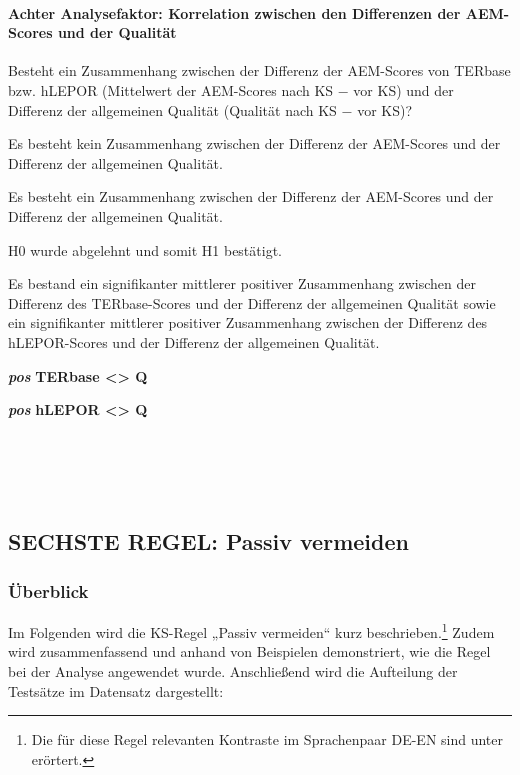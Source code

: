 \paragraph*{Achter Analysefaktor: Korrelation zwischen den Differenzen der AEM-Scores und der Qualität}
\begin{description}[font=\normalfont\bfseries]
\item [Fragestellung:] Besteht ein Zusammenhang zwischen der Differenz der AEM-Scores von TERbase bzw. hLEPOR (Mittelwert der AEM-Scores nach KS $-$ vor KS) und der Differenz der allgemeinen Qualität (Qualität nach KS $-$ vor KS)?
\item [H0 --] Es besteht kein Zusammenhang zwischen der Differenz der AEM-Scores und der Differenz der allgemeinen Qualität.
\item [H1 --] Es besteht ein Zusammenhang zwischen der Differenz der AEM-Scores und der Differenz der allgemeinen Qualität.
\item [Resultat]
\end{description}
\noindent
\parbox[t]{.7\textwidth}{
H0 wurde abgelehnt und somit H1 bestätigt.

Es bestand ein signifikanter mittlerer positiver Zusammenhang zwischen der Differenz des TERbase-Scores und der Differenz der allgemeinen Qualität sowie ein signifikanter mittlerer positiver Zusammenhang zwischen der Differenz des hLEPOR-Scores und der Differenz der allgemeinen Qualität.
}
\parbox[t]{.04\textwidth}{}
\colorbox{smGreen}{\parbox[t]{.25\textwidth}{
{ \textbf{\textit{pos} }\textbf{TERbase <> Q}}

 \textbf{\textit{pos} }\textbf{hLEPOR <> Q}\\
 \\
 \\
 \\
 \\
}}




\subsection{SECHSTE REGEL: Passiv vermeiden}
\label{sec:5.3.6}
 \subsubsection{\label{sec:5.3.6.0}Überblick}

Im Folgenden wird die KS-Regel „Passiv vermeiden“ kurz beschrieben.\footnote{\textrm{Die für diese Regel relevanten Kontraste im Sprachenpaar DE-EN sind unter  erörtert.} } Zudem wird zusammenfassend und anhand von Beispielen demonstriert, wie die Regel bei der Analyse angewendet wurde. Anschließend wird die Aufteilung der Testsätze im Datensatz dargestellt:

